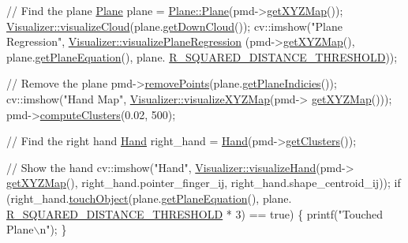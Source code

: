 \begin{DoxyCodeInclude}
        \textcolor{comment}{// Find the plane}
        \hyperlink{class_plane}{Plane} plane = \hyperlink{class_plane_acac0d9c003e0ab10d07b146c3566a0c7}{Plane::Plane}(pmd->\hyperlink{class_depth_camera_a0c295c5a0696550f453b1c8cd0fcb188}{getXYZMap}());
        \hyperlink{class_visualizer_af65e36aaef7c1f60d0f79819f17707d7}{Visualizer::visualizeCloud}(plane.\hyperlink{class_plane_abad6f7c26005ad7ab847af5acaad9c31}{getDownCloud}());
        cv::imshow(\textcolor{stringliteral}{"Plane Regression"}, \hyperlink{class_visualizer_a448063633391ee4ae2af595fe760aab0}{Visualizer::visualizePlaneRegression}
      (pmd->\hyperlink{class_depth_camera_a0c295c5a0696550f453b1c8cd0fcb188}{getXYZMap}(), plane.\hyperlink{class_plane_aafedb091ba358d46d5203c4e0eb6e838}{getPlaneEquation}(), plane.
      \hyperlink{class_plane_ae0e9b28377ab03e577aa6588da269328}{R\_SQUARED\_DISTANCE\_THRESHOLD}));
        
        \textcolor{comment}{// Remove the plane}
        pmd->\hyperlink{class_depth_camera_a8f38ced63dcfb0c4c56cb7d4e940bcd8}{removePoints}(plane.\hyperlink{class_plane_a843717e035e2e6b4e03a8eece14098b1}{getPlaneIndicies}());
        cv::imshow(\textcolor{stringliteral}{"Hand Map"}, \hyperlink{class_visualizer_a24caf117be9878e2f5ad35cabb7f4f88}{Visualizer::visualizeXYZMap}(pmd->
      \hyperlink{class_depth_camera_a0c295c5a0696550f453b1c8cd0fcb188}{getXYZMap}()));
        pmd->\hyperlink{class_depth_camera_a009719ec313de883b617903360bdf519}{computeClusters}(0.02, 500);
        
        \textcolor{comment}{// Find the right hand}
        \hyperlink{class_hand}{Hand} right\_hand = \hyperlink{class_hand}{Hand}(pmd->\hyperlink{class_depth_camera_a18d88b8df2a08c9c167207fea587d66e}{getClusters}());
        
        \textcolor{comment}{// Show the hand}
        cv::imshow(\textcolor{stringliteral}{"Hand"}, \hyperlink{class_visualizer_aa4436945eb7f9220b55d46914e8c5005}{Visualizer::visualizeHand}(pmd->
      \hyperlink{class_depth_camera_a0c295c5a0696550f453b1c8cd0fcb188}{getXYZMap}(), right\_hand.pointer\_finger\_ij, right\_hand.shape\_centroid\_ij));
        \textcolor{keywordflow}{if} (right\_hand.\hyperlink{class_hand_aad89c3e47921cb0c39430f4501238088}{touchObject}(plane.\hyperlink{class_plane_aafedb091ba358d46d5203c4e0eb6e838}{getPlaneEquation}(), plane.
      \hyperlink{class_plane_ae0e9b28377ab03e577aa6588da269328}{R\_SQUARED\_DISTANCE\_THRESHOLD} * 3) == \textcolor{keyword}{true})
        \{
            printf(\textcolor{stringliteral}{"Touched Plane\(\backslash\)n"});
        \}
        


\end{DoxyCodeInclude}
